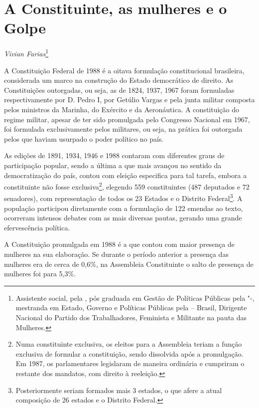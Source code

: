 \chapter*{A Constituinte, as mulheres e o Golpe}


\emph{Vivian Farias}\footnote{Assistente social, pela , pós graduada em
  Gestão de Políticas Públicas pela "-, mestranda em Estado,
  Governo e Políticas Públicas pela  -- Brasil, Dirigente Nacional
  do Partido dos Trabalhadores, Feminista e Militante na pauta das
  Mulheres.}

A Constituição Federal de 1988 é a oitava formulação constitucional
brasileira, considerada um marco na construção do Estado democrático de
direito. As Constituições outorgadas, ou seja, as de 1824, 1937, 1967
foram formuladas respectivamente por D. Pedro I, por Getúlio Vargas e
pela junta militar composta pelos ministros da Marinha, do Exército e da
Aeronáutica. A constituição do regime militar, apesar de ter sido
promulgada pelo Congresso Nacional em 1967, foi formulada exclusivamente
pelos militares, ou seja, na prática foi outorgada pelos que haviam
usurpado o poder político no país.

As edições de 1891, 1934, 1946 e 1988 contaram com diferentes graus de
participação popular, sendo a última a que mais avançou no sentido da
democratização do país, contou com eleição especifica para tal tarefa,
embora a constituinte não fosse exclusiva\footnote{Numa constituinte
  exclusiva, os eleitos para a Assembleia teriam a função exclusiva de
  formular a constituição, sendo dissolvida após a promulgação. Em 1987,
  os parlamentares legislaram de maneira ordinária e cumpriram o
  restante dos mandatos, com direito à reeleição.}, elegendo 559
constituintes (487 deputados e 72 senadores), com representação de todos
os 23 Estados e o Distrito Federal\footnote{Posteriormente seriam
  formados mais 3 estados, o que afere a atual composição de 26 estados
  e o Distrito Federal.}. A população participou diretamente com a
formulação de 122 emendas ao texto, ocorreram intensos debates com as
mais diversas pautas, gerando uma grande efervescência política.

A Constituição promulgada em 1988 é a que contou com maior presença de
mulheres na sua elaboração. Se durante o período anterior a presença das
mulheres era de cerca de 0,6\%, na Assembleia Constituinte o salto de
presença de mulheres foi para 5,3\%.

